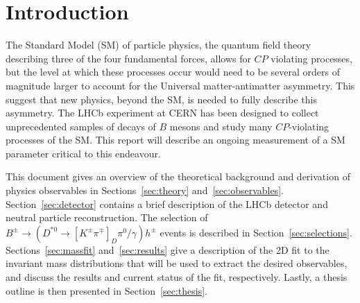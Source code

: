 \documentclass[oneside,12pt]{article}
\begin{document}
\section{\normalsize Introduction}
The Standard Model (SM) of particle physics, the quantum field theory describing
three of the four fundamental forces, allows for $CP$ violating processes, but the
level at which these processes occur would need to be several orders of
magnitude larger to account for the Universal matter-antimatter asymmetry. This
suggest that new physics, beyond the SM, is needed to fully describe this
asymmetry. The LHCb experiment at CERN has been designed to collect
unprecedented samples of decays of $B$ mesons and study many $CP$-violating
processes of the SM. This report will describe an ongoing measurement of a SM
parameter critical to this endeavour.

This document gives an overview of the theoretical background and derivation of
physics observables in Sections~\ref{sec:theory} and~\ref{sec:observables}.
Section~\ref{sec:detector} contains a brief description of the LHCb detector and
neutral particle reconstruction. The selection of $B^{\pm}\rightarrow
(D^{*0}\rightarrow [K^{\pm}\pi^{\mp}]_D\pi^0/\gamma)h^{\pm}$ events is described
in Section~\ref{sec:selections}. Sections~\ref{sec:massfit}
and~\ref{sec:results} give a description of the 2D fit to the invariant mass
distributions that will be used to extract the desired observables, and discuss
the results and current status of the fit, respectively. Lastly, a thesis
outline is then presented in Section~\ref{sec:thesis}. 
\end{document}

